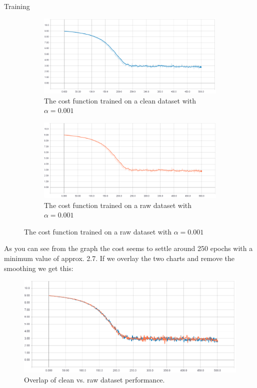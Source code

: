 \documentclass[titlepage]{article}
\begin{document}
Training
\begin{figure}[H]
	\centering
	\begin{subfigure}[b]{0.4\linewidth}
		\centering
		\includegraphics[width=\linewidth]{cost-clean-001.png}
		\caption{The cost function trained on a clean dataset with $\alpha = 0.001$}
	\end{subfigure}
	\begin{subfigure}[b]{0.4\linewidth}
		\centering
		\includegraphics[width=\linewidth]{cost-raw-001.png}
		\caption{The cost function trained on a raw dataset with $\alpha = 0.001$}
	\end{subfigure}
	\label{fig:ccr001}
\end{figure}
As you can see from the graph the cost seems to settle around 250 epochs with a minimum value of approx. 2.7. If we overlay the two charts and remove the smoothing we get this:
\begin{figure}[H]
	\centering
	\includegraphics[width=120mm]{cost-overlap-001.png}
	\caption{Overlap of clean vs. raw dataset performance.}
	\label{fig:co001}
\end{figure}
\end{document}
